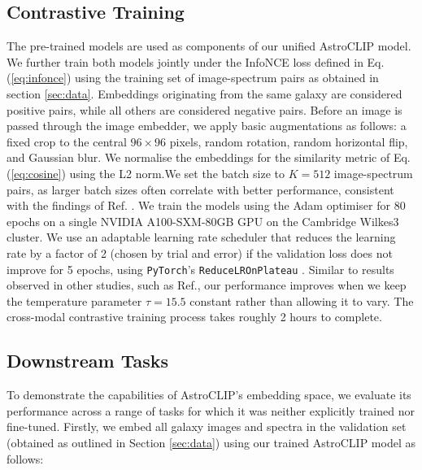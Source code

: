\documentclass[a4paper,12pt]{article}
\begin{document}
\subsection{Contrastive Training}
\label{sec:training}
The pre-trained models are used as components of our unified AstroCLIP model. We further train both models jointly under the InfoNCE loss defined in Eq. (\ref{eq:infonce}) using the training set of image-spectrum pairs as obtained in section \ref{sec:data}. Embeddings originating from the same galaxy are considered positive pairs, while all others are considered negative pairs. Before an image is passed through the image embedder, we apply basic augmentations as follows: a fixed crop to the central $96 \times 96$ pixels, random rotation, random horizontal flip, and Gaussian blur. We normalise the embeddings for the similarity metric of Eq. (\ref{eq:cosine}) using the L2 norm.We set the batch size to $K=512$ image-spectrum pairs, as larger batch sizes often correlate with better performance, consistent with the findings of Ref. \cite{radford2021learning}. We train the models using the Adam optimiser \cite{adam} for 80 epochs on a single NVIDIA A100-SXM-80GB GPU on the Cambridge Wilkes3 cluster. We use an adaptable learning rate scheduler that reduces the learning rate by a factor of 2 (chosen by trial and error) if the validation loss does not improve for 5 epochs, using \verb|PyTorch|'s \verb|ReduceLROnPlateau| \cite{LRon}. Similar to results observed in other studies, such as Ref.\cite{gir}, our performance improves when we keep the temperature parameter $\tau = 15.5$ constant rather than allowing it to vary. The cross-modal contrastive training process takes roughly 2 hours to complete.

\subsection{Downstream Tasks}
\label{sec:downstream_tasks}
To demonstrate the capabilities of AstroCLIP's embedding space, we evaluate its performance across a range of tasks for which it was neither explicitly trained nor fine-tuned. Firstly, we embed all galaxy images and spectra in the validation set (obtained as outlined in Section \ref{sec:data}) using our trained AstroCLIP model as follows:
\end{document}
